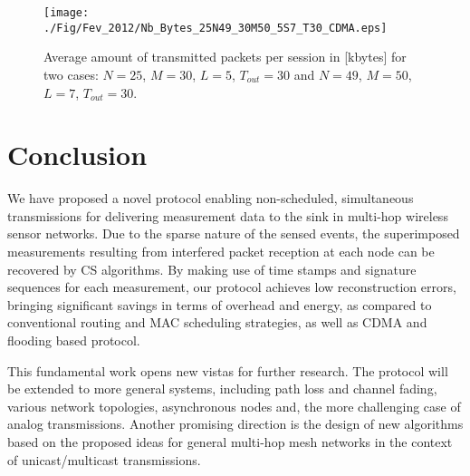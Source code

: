 \documentclass[letterpaper,conference]{IEEEtran}
\begin{document}
\begin{figure}[h]
\begin{center}
   \texttt{[image: ./Fig/Fev\_2012/Nb\_Bytes\_25N49\_30M50\_5S7\_T30\_CDMA.eps]} \caption{Average amount of transmitted packets per session in [kbytes] for two cases: $N=25$, $M=30$, $L=5$, $T_{out}=30$ and $N=49$, $M=50$, $L=7$, $T_{out}=30$.}
\label{fig:Bits}
\end{center}
\vspace{-0.6cm}
\end{figure}



\section{Conclusion}

We have proposed a novel protocol enabling non-scheduled, simultaneous transmissions for delivering measurement data to the sink in multi-hop wireless sensor networks.
Due to the sparse nature of the sensed events, the superimposed measurements resulting from interfered packet reception at each node can be recovered by CS algorithms. By making use of time stamps and signature sequences for each measurement, our protocol achieves low reconstruction errors, bringing significant savings in terms of overhead and energy, as compared to conventional routing and MAC scheduling strategies, as well as CDMA and flooding based protocol.

This fundamental work opens new vistas for further research. The protocol will be extended to more general systems, including path loss and channel fading, various network topologies, asynchronous nodes and, the more challenging case of analog transmissions. Another promising direction is the design of new algorithms based on the proposed ideas for general multi-hop mesh networks in the context of unicast/multicast transmissions.





\end{document}
